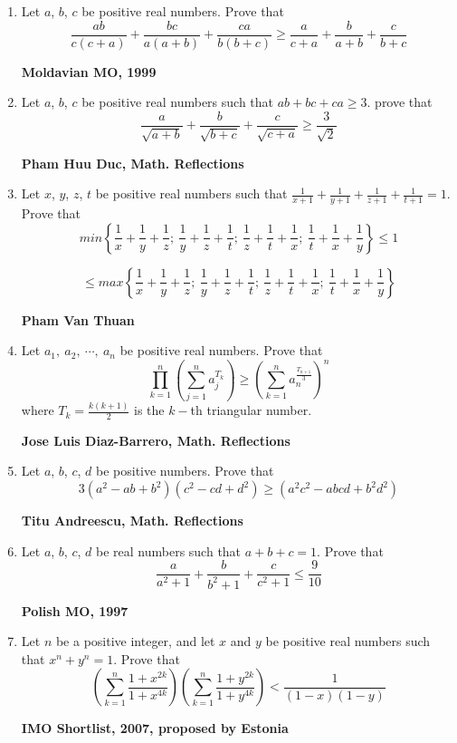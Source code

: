 \documentclass{article}
\begin{document}
\begin{enumerate}
\item Let $a$, $b$, $c$ be positive real numbers. Prove that $$\frac {ab}{c (c+a)}+\frac {bc}{a (a+b)}+\frac {ca}{b (b+c)}\geq \frac {a}{c+a}+\frac {b}{a+b}+\frac {c}{b+c}$$
\begin {flushright}
\textbf{Moldavian MO, 1999}
\end{flushright}
\item Let $a$, $b$, $c$ be positive real numbers such that $ab+bc+ca\geq 3$. prove that $$\frac {a}{\sqrt {a+b}}+\frac {b}{\sqrt {b+c}}+\frac {c}{\sqrt {c+a}}\geq \frac {3}{\sqrt {2}}$$
\begin {flushright}
\textbf{Pham Huu Duc, Math. Reflections}
\end{flushright}
\item Let $x$, $y$, $z$, $t $ be positive real numbers such that $\displaystyle{\frac {1}{x+1}+\frac {1}{y+1}+\frac {1}{z+1}+\frac {1}{t+1}}=1$. Prove that $$min\left \{\frac {1}{x}+\frac {1}{y}+\frac {1}{z};\ \frac {1}{y}+\frac {1}{z}+\frac {1}{t};\ \frac {1}{z}+\frac {1}{t}+\frac {1}{x};\    \frac {1}{t}+\frac {1}{x}+\frac {1}{y}\right \}\leq 1 $$

$$\leq max\left \{\frac {1}{x}+\frac {1}{y}+\frac {1}{z};\ \frac {1}{y}+\frac {1}{z}+\frac {1}{t};\ \frac {1}{z}+\frac {1}{t}+\frac {1}{x};\    \frac {1}{t}+\frac {1}{x}+\frac {1}{y}\right \}$$
\begin {flushright}
\textbf{Pham Van Thuan}
\end{flushright}
\item Let $a_1,\ a_2,\ \cdots ,\ a_n $ be positive real numbers. Prove that $$\prod \limits_{k=1}^n \left (\sum \limits_{j=1}^na_j^{T_k} \right )\geq  \left (\sum \limits_{k=1}^na_n^{\frac {T_{n+1}}{3}} \right )^n$$ where $T_k = \displaystyle{\frac {k (k+1)}{2}}$ is the $k-$th triangular number.
\begin {flushright}
\textbf{Jose Luis Diaz-Barrero, Math. Reflections}
\end{flushright}
\item Let $a$, $b$, $c$, $d $ be positive numbers. Prove that $$3 (a^2-ab+b^2)(c^2-cd+d^2)\geq (a^2c^2-abcd+b^2d^2)$$
\begin {flushright}
\textbf{Titu Andreescu, Math. Reflections}
\end{flushright}
\item Let $a$, $b$, $c$, $d $ be real numbers such that $a+b+c=1$. Prove that $$\frac {a}{a^2+1}+\frac {b}{b^2+1}+\frac{c}{c^2+1}\leq \frac{9}{10}$$
\begin {flushright}
\textbf{Polish MO, 1997}
\end{flushright}
\item Let $n $ be a positive integer, and let $x $ and $y $ be positive real numbers such that $x^n+y^n=1$. Prove that $$\left (\sum \limits_{k=1}^n \frac {1+x^{2k}}{1+x^{4k}}\right )\left (\sum \limits_{k=1}^n \frac {1+y^{2k}}{1+y^{4k}} \right )< \frac {1}{(1-x)(1-y)}$$
\begin {flushright}
\textbf{IMO Shortlist, 2007, proposed by Estonia}
\end{flushright}
\pagebreak 


\end{enumerate}
\end{document}
